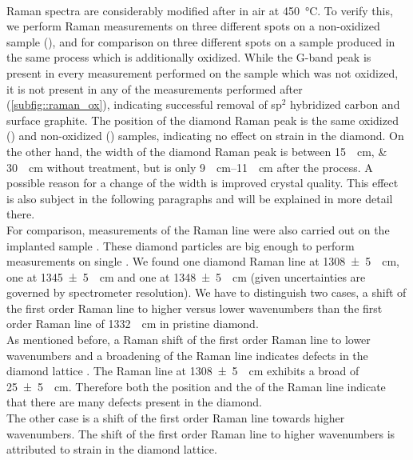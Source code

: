 		\\
		\Nd Raman spectra are considerably modified after \ox in air at \SI{450}{\degreeCelsius}.
		To verify this, we perform Raman measurements on three different spots on a non-oxidized sample (\insituS), and for comparison on three different spots on a sample produced in the same process which is additionally oxidized.
		While the G-band peak is present in every measurement performed on the sample which was not oxidized, it is not present in any of the measurements performed after \ox (\autoref{subfig::raman_ox}), indicating successful removal of sp$^2$ hybridized carbon and surface graphite.
		The position of the diamond Raman peak is the same oxidized (\insituSo) and non-oxidized (\insituSn) samples, indicating no effect on strain in the diamond.
		On the other hand, the width of the diamond Raman peak is between \SIlist{15; 30}{\per\centi\meter} without \ox treatment, but is only \SIrange{9}{11}{\per\centi\meter} after the \ox process.
		A possible reason for a change of the width is improved crystal quality.
		This effect is also subject in the following paragraphs and will be explained in more detail there.
		\\
		For comparison, measurements of the Raman line were also carried out on the implanted sample \implantedTao.
		These diamond particles are big enough to perform measurements on single \nds.
		We found one diamond Raman line at \SI[separate-uncertainty]{1308+-5}{\per\centi\meter}, one at \SI[separate-uncertainty]{1345+-5}{\per\centi\meter} and one at \SI[separate-uncertainty]{1348+-5}{\per\centi\meter} (given uncertainties are governed by spectrometer resolution).
		We have to distinguish two cases, a shift of the first order Raman line to higher versus lower wavenumbers than the first order Raman line of \SI{1332}{\per\centi\meter} in pristine diamond.
		\\
		As mentioned before, a Raman shift of the first order Raman line to lower wavenumbers and a broadening of the Raman line indicates defects in the diamond lattice \cite{Prawer2004}.
		The Raman line at \SI[separate-uncertainty]{1308+-5}{\per\centi\meter} exhibits a broad \lw of \SI[separate-uncertainty]{25+-5}{\per\centi\meter}.
		Therefore both the position and the \lw of the Raman line indicate that there are many defects present in the diamond.
		\\
		The other case is a shift of the first order Raman line towards higher wavenumbers.
		The shift of the first order Raman line to higher wavenumbers is attributed to strain in the diamond lattice.
